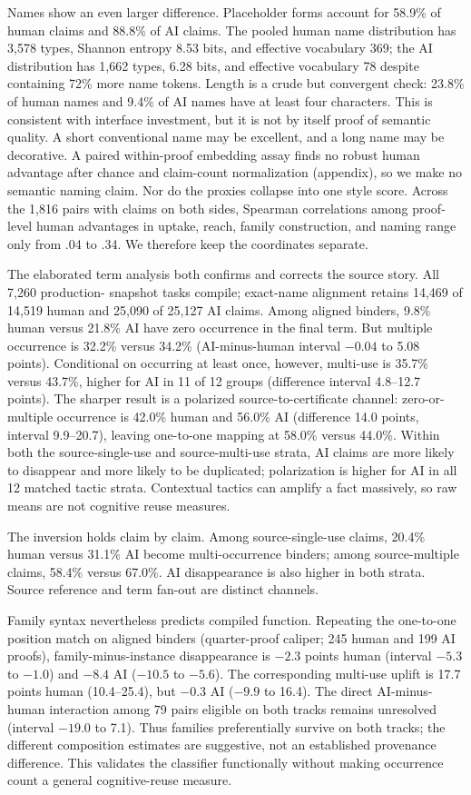 \documentclass[10pt]{article}
\begin{document}
Names show an even larger difference.  Placeholder forms account for 58.9\% of human claims and
88.8\% of AI claims.  The pooled human name distribution has 3,578 types, Shannon entropy 8.53 bits,
and effective vocabulary 369; the AI distribution has 1,662 types, 6.28 bits, and effective
vocabulary 78 despite containing 72\% more name tokens.  Length is a crude but convergent check:
23.8\% of human names and 9.4\% of AI names have at least four characters.  This is consistent with
interface investment, but it is not by itself proof of semantic quality.  A short conventional name
may be excellent, and a long name may be decorative.  A paired within-proof embedding assay finds
no robust human advantage after chance and claim-count normalization (appendix), so we make no
semantic naming claim.
Nor do the proxies collapse into one style score.  Across the 1,816 pairs with claims on both sides,
Spearman correlations among proof-level human advantages in uptake, reach, family construction, and
naming range only from .04 to .34.  We therefore keep the coordinates separate.

The elaborated term analysis both confirms and corrects the source story.  All 7,260 production-
snapshot tasks compile; exact-name alignment retains 14,469 of 14,519 human and 25,090 of 25,127 AI
claims.  Among aligned binders, 9.8\% human versus 21.8\% AI have zero occurrence in the final term.
But multiple occurrence is 32.2\% versus 34.2\% (AI-minus-human interval $-0.04$ to 5.08 points).
Conditional on occurring at least once, however, multi-use is 35.7\% versus 43.7\%, higher for AI
in 11 of 12 groups (difference interval 4.8--12.7 points).
The sharper result is a polarized source-to-certificate channel: zero-or-multiple occurrence is
42.0\% human and 56.0\% AI (difference 14.0 points, interval 9.9--20.7), leaving one-to-one mapping
at 58.0\% versus 44.0\%.  Within both the source-single-use and source-multi-use strata, AI claims
are more likely to disappear and more likely to be duplicated; polarization is higher for AI in
all 12 matched tactic strata.  Contextual tactics can amplify a fact massively, so raw means are not
cognitive reuse measures.

The inversion holds claim by claim.  Among source-single-use claims, 20.4\% human versus 31.1\% AI
become multi-occurrence binders; among source-multiple claims, 58.4\% versus 67.0\%.  AI
disappearance is also higher in both strata.  Source reference and term fan-out are distinct channels.

Family syntax nevertheless predicts compiled function.  Repeating the one-to-one position match on
aligned binders (quarter-proof caliper; 245 human and 199 AI proofs), family-minus-instance
disappearance is $-2.3$ points human (interval $-5.3$ to $-1.0$) and $-8.4$ AI ($-10.5$ to $-5.6$).
The corresponding multi-use uplift is 17.7 points human (10.4--25.4), but $-0.3$ AI ($-9.9$ to
16.4).  The direct AI-minus-human interaction among 79 pairs eligible on both tracks remains
unresolved (interval $-19.0$ to 7.1).  Thus families preferentially survive on both tracks; the
different composition estimates are suggestive, not an established provenance difference.  This
validates the classifier functionally without making occurrence count a general cognitive-reuse
measure.
\end{document}
